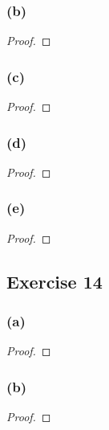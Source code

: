 \documentclass[14pt]{extarticle}
\begin{document}
\subsubsection{(b)}

\begin{proof}

\end{proof}

\subsubsection{(c)}

\begin{proof}

\end{proof}

\subsubsection{(d)}

\begin{proof}

\end{proof}

\subsubsection{(e)}

\begin{proof}

\end{proof}

\subsection{Exercise 14}

\subsubsection{(a)}

\begin{proof}

\end{proof}

\subsubsection{(b)}

\begin{proof}

\end{proof}
\end{document}

